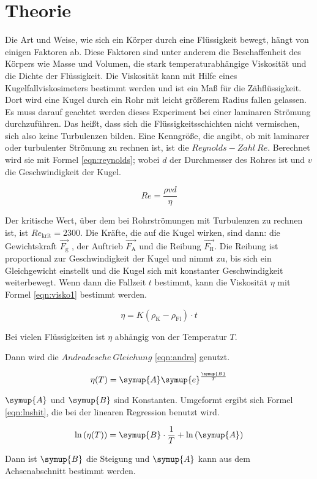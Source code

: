 \section{Theorie}
\label{sec:Theorie}

Die Art und Weise, wie sich ein Körper durch eine Flüssigkeit
bewegt, hängt von einigen Faktoren ab. Diese Faktoren sind unter anderem
 die Beschaffenheit des Körpers wie Masse und Volumen, die stark temperaturabhängige
Viskosität und die Dichte der Flüssigkeit.
Die  Viskosität kann mit Hilfe eines Kugelfallviskosimeters bestimmt werden und
ist ein Maß für die Zähflüssigkeit.
Dort wird eine Kugel durch ein Rohr mit leicht größerem Radius fallen gelassen.
Es muss darauf geachtet werden dieses Experiment bei einer laminaren
Strömung durchzuführen. Das heißt, dass sich die Flüssigkeitsschichten nicht
vermischen, sich also keine Turbulenzen bilden.
Eine Kenngröße, die angibt, ob mit laminarer oder turbulenter Strömung
zu rechnen ist, ist die $Reynolds-Zahl~Re$. Berechnet wird sie mit Formel
\eqref{eqn:reynolds}; wobei $d$ der Durchmesser des Rohres ist und $v$
die Geschwindigkeit der Kugel.

\begin{equation}
  Re = \frac{\rho v d}{\eta}
  \label{eqn:reynolds}
\end{equation}

Der kritische Wert, über dem bei Rohrströmungen mit Turbulenzen zu rechnen
ist, ist $Re_{\text{krit}} = 2300$.
Die Kräfte, die auf die Kugel wirken, sind dann: die Gewichtskraft $\vec{F_{\text{g}}}$
, der Auftrieb $\vec{F_{\text{A}}}$ und die Reibung $\vec{F_{\text{R}}}$.
Die Reibung ist proportional zur Geschwindigkeit der Kugel und nimmt zu, bis
sich ein Gleichgewicht einstellt und die Kugel sich mit konstanter Geschwindigkeit
weiterbewegt.
Wenn dann die Fallzeit $t$ bestimmt, kann die Viskosität $\eta$ mit Formel
\eqref{eqn:visko1} bestimmt werden.

\begin{equation}
  \eta = K (\rho_{\text{K}}-\rho_{\text{Fl}}) \cdot t
  \label{eqn:visko1}
\end{equation}

Bei vielen Flüssigkeiten ist $\eta$ abhängig von der Temperatur $T$.

Dann
wird die $Andradesche~Gleichung$ \eqref{eqn:andra} genutzt.

\begin{equation}
  \eta(T) = \symup{A} \symup{e}^{\frac{\symup{B}}{T}}
  \label{eqn:andra}
\end{equation}

$\symup{A}$ und $\symup{B}$ sind Konstanten.
Umgeformt ergibt sich Formel \eqref{eqn:lnshit}, die bei der linearen Regression
benutzt wird.

\begin{equation}
  \ln{(\eta(T))} = \symup{B} \cdot \frac{1}{T} + \ln{(\symup{A})}
  \label{eqn:lnshit}
\end{equation}

Dann ist $\symup{B}$ die Steigung und $\symup{A}$ kann aus dem Achsenabschnitt
bestimmt werden.
